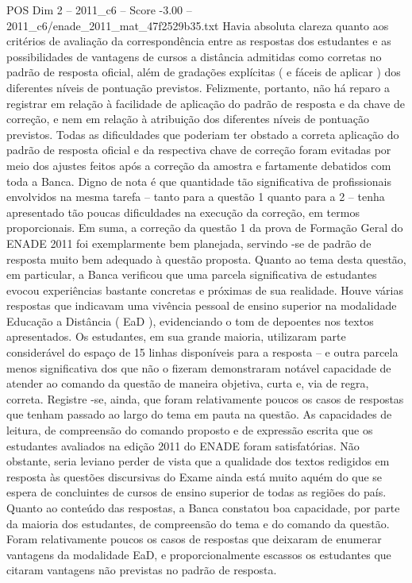 \begin{textsample}{POS Dim 2 – 2011\_c6 – Score -3.00 – 2011\_c6/enade\_2011\_mat\_47f2529b35.txt}
Havia absoluta clareza quanto aos critérios de avaliação da correspondência entre as respostas dos estudantes e as possibilidades de vantagens de cursos a distância admitidas como corretas no padrão de resposta oficial, além de gradações explícitas ( e fáceis de aplicar ) dos diferentes níveis de pontuação previstos.
Felizmente, portanto, não há reparo a registrar em relação à facilidade de aplicação do padrão de resposta e da chave de correção, e nem em relação à atribuição dos diferentes níveis de pontuação previstos.
Todas as dificuldades que poderiam ter obstado a correta aplicação do padrão de resposta oficial e da respectiva chave de correção foram evitadas por meio dos ajustes feitos após a correção da amostra e fartamente debatidos com toda a Banca.
Digno de nota é que quantidade tão significativa de profissionais envolvidos na mesma tarefa – tanto para a questão 1 quanto para a 2 – tenha apresentado tão poucas dificuldades na execução da correção, em termos proporcionais.
Em suma, a correção da questão 1 da prova de Formação Geral do ENADE 2011 foi exemplarmente bem planejada, servindo -se de padrão de resposta muito bem adequado à questão proposta.
Quanto ao tema desta questão, em particular, a Banca verificou que uma parcela significativa de estudantes evocou experiências bastante concretas e próximas de sua realidade.
Houve várias respostas que indicavam uma vivência pessoal de ensino superior na modalidade Educação a Distância ( EaD ), evidenciando o tom de depoentes nos textos apresentados.
Os estudantes, em sua grande maioria, utilizaram parte considerável do espaço de 15 linhas disponíveis para a resposta – e outra parcela menos significativa dos que não o fizeram demonstraram notável capacidade de atender ao comando da questão de maneira objetiva, curta e, via de regra, correta.
Registre -se, ainda, que foram relativamente poucos os casos de respostas que tenham passado ao largo do tema em pauta na questão.
As capacidades de leitura, de compreensão do comando proposto e de expressão escrita que os estudantes avaliados na edição 2011 do ENADE foram satisfatórias.
Não obstante, seria leviano perder de vista que a qualidade dos textos redigidos em resposta às questões discursivas do Exame ainda está muito aquém do que se espera de concluintes de cursos de ensino superior de todas as regiões do país.
Quanto ao conteúdo das respostas, a Banca constatou boa capacidade, por parte da maioria dos estudantes, de compreensão do tema e do comando da questão.
Foram relativamente poucos os casos de respostas que deixaram de enumerar vantagens da modalidade EaD, e proporcionalmente escassos os estudantes que citaram vantagens não previstas no padrão de resposta.

\end{textsample}
